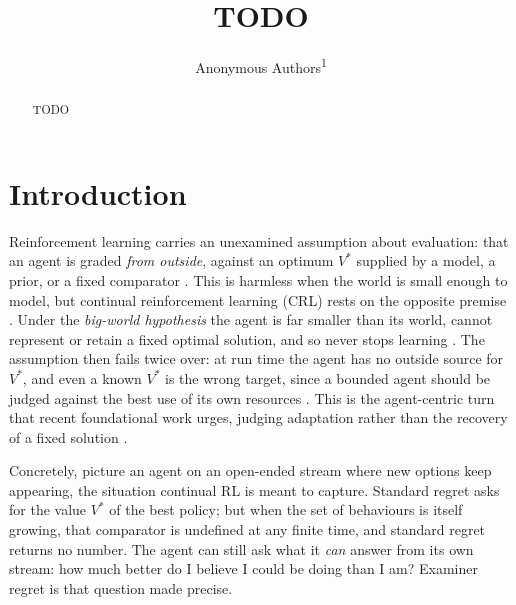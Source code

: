 \documentclass[10pt]{article} %
\title{TODO}
\author{Anonymous Authors\textsuperscript{1}}
\theoremstyle{definition}
\theoremstyle{plain}
\begin{document}
\makeCover
\maketitle

\begin{abstract}
TODO
\end{abstract}

\section{Introduction}
\label{sec:intro}

Reinforcement learning carries an unexamined assumption about evaluation: that an agent is graded \emph{from outside}, against an optimum $V^{*}$ supplied by a model, a prior, or a fixed comparator \citep{lai1985asymptotically,jaksch2010ucrl2}. This is harmless when the world is small enough to model, but continual reinforcement learning (CRL) rests on the opposite premise \citep{ring1994continual,abel2023definition}. Under the \emph{big-world hypothesis} the agent is far smaller than its world, cannot represent or retain a fixed optimal solution, and so never stops learning \citep{javed2025bigworld,lewandowski2025bigger,dohare2024plasticity}. The assumption then fails twice over: at run time the agent has no outside source for $V^{*}$, and even a known $V^{*}$ is the wrong target, since a bounded agent should be judged against the best use of its own resources \citep{simon1955behavioral,russell1995bounded,lewis2014computational,lieder2020resource}. This is the agent-centric turn that recent foundational work urges, judging adaptation rather than the recovery of a fixed solution \citep{abel2024dogmas}.

Concretely, picture an agent on an open-ended stream where new options keep appearing, the situation continual RL is meant to capture. Standard regret asks for the value $V^{*}$ of the best policy; but when the set of behaviours is itself growing, that comparator is undefined at any finite time, and standard regret returns no number. The agent can still ask what it \emph{can} answer from its own stream: how much better do I believe I could be doing than I am? Examiner regret is that question made precise.
\end{document}
